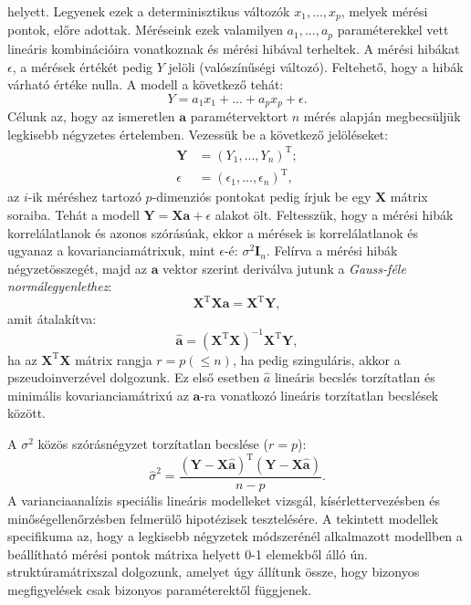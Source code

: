 \documentclass[%
	DIV=15,appendixprefix]{scrreprt}
\theoremstyle{definition}
\theoremstyle{remark}
\DeclareMathOperator{\T}{T}
\begin{document}
helyett. Legyenek ezek a determinisztikus változók $x_1,...,x_p$, melyek mérési pontok, előre
adottak. Méréseink ezek valamilyen $a_1,...,a_p$ paraméterekkel vett lineáris kombinációira
vonatkoznak és mérési hibával terheltek. A mérési hibákat $\epsilon$, a mérések értékét pedig $Y$
jelöli (valószínűségi változó). Feltehető, hogy a hibák várható értéke nulla. A modell a következő
tehát:
\begin{equation*}
	Y=a_1 x_1 + ... + a_p x_p + \epsilon.
\end{equation*}
Célunk az, hogy az ismeretlen $\mathbf{a}$ paramétervektort $n$ mérés alapján megbecsüljük legkisebb
négyzetes értelemben. Vezessük be a következő jelöléseket:
\begin{align*}
	\mathbf{Y} &= \left(Y_1,...,Y_n\right)^{\T};\\
	\epsilon &= (\epsilon_1,...,\epsilon_n)^{\T},
\end{align*}
az $i$-ik méréshez tartozó $p$-dimenziós pontokat pedig írjuk be egy $\mathbf{X}$ mátrix soraiba.
Tehát a modell $\mathbf{Y}=\mathbf{X} \mathbf{a} + \epsilon$ alakot ölt. Feltesszük, hogy a mérési
hibák korrelálatlanok és azonos szórásúak, ekkor a mérések is korrelálatlanok és ugyanaz a
kovarianciamátrixuk, mint $\epsilon$-é: $\sigma^2 \mathbf{I}_n$. Felírva a mérési hibák
négyzetösszegét, majd
az $\mathbf{a}$ vektor szerint deriválva jutunk a \emph{Gauss-féle normálegyenlethez}:
\begin{equation*}
	\mathbf{X}^{\T} \mathbf{X} \mathbf{a} = \mathbf{X}^{\T} \mathbf{Y},
\end{equation*}
amit átalakítva:
\[
\hat{\mathbf{a} } =\left( \mathbf{X}^{\T} \mathbf{X} \right) ^{-1} \mathbf{X}^{\T} \mathbf{Y},
\]
ha az $\mathbf{X}^{\T} \mathbf{X}$ mátrix rangja $r=p \left( \le n \right) $, ha pedig szinguláris,
akkor a pszeudoinverzével dolgozunk. Ez első esetben $\hat{a}$ lineáris becslés torzítatlan és
minimális kovarianciamátrixú az $\mathbf{a}$-ra vonatkozó lineáris torzítatlan becslések között.

A $\sigma ^2$ közös szórásnégyzet torzítatlan becslése ($r=p$):
\begin{equation*}
	\hat{\sigma}^2 =\frac{ \left( \mathbf{ Y } - \mathbf{ X } \hat{\mathbf{a} } \right) ^{ \T }
	\left( \mathbf{ Y } - \mathbf{ X } \hat{\mathbf{a} } \right) }{n-p}.
\end{equation*}
%
A varianciaanalízis speciális lineáris modelleket vizsgál, kísérlettervezésben és
minőségellenőrzésben felmerülő hipotézisek tesztelésére. A tekintett modellek
specifikuma az, hogy a legkisebb négyzetek módszerénél alkalmazott modellben a beállítható mérési
pontok mátrixa helyett 0-1 elemekből álló ún. struktúramátrixszal dolgozunk, amelyet úgy állítunk
össze, hogy bizonyos megfigyelések csak bizonyos paraméterektől függjenek.
\end{document}
